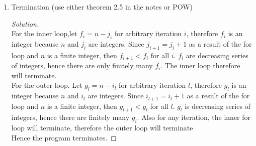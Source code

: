 \documentclass[11pt]{article}
\theoremstyle{plain}%
\theoremstyle{definition}
\theoremstyle{remark}
\newenvironment{solution}
  {\begin{proof}[Solution]}
  {\end{proof}}
\begin{document}
\begin{enumerate}
\begin{enumerate}
\begin{solution}
      \begin{center}
        Suppose that the program executes and satisfies precondition. If the program terminates, when it does, the post condition holds.
      \end{center}

      When the outer for loop terminates, then $i=n-1$, by state invariant proved previously, $min$ is the minimum of any points in $L[0..n-2]$ and $L[0..n-1]$ and $u,v$ are corresponding indices of closest pair of points. We can see that this covers the entirety of points in the list. Therefore the returned pair of points $L[u], L[v]$ are pairs of points with minimum distance.

    \end{solution}
    \item Termination (use either theorem 2.5 in the notes or POW)
    \begin{solution}
      $ $\\
      For the inner loop,let $f_i=n-j_i$ for arbitrary iteration $i$, therefore $f_i$ is an integer because $n$ and $j_i$ are integers. Since $j_{i+1} = j_i + 1$ as a result of the for loop and $n$ is a finite integer, then $f_{i+1} < f_i$ for all $i$. $f_i$ are decreasing series of integers, hence there are only finitely many $f_i$. The inner loop therefore will terminate. \\

      For the outer loop. Let $g_l = n-i_l$ for arbitrary iteration $l$, therefore $g_l$ is an integer because $n$ and $i_l$ are integers. Since $i_{l+1}  = i_l + 1$ as a result of the for loop and $n$ is a finite integer, then $g_{l+1}<g_l$ for all $l$. $g_l$ is decreasing series of integers, hence there are finitely many $g_i$. Also for any iteration, the inner for loop will terminate, therefore the outer loop will terminate \\

      Hence the program terminates.
    \end{solution}
  \end{enumerate}
\end{enumerate}
\end{document}

